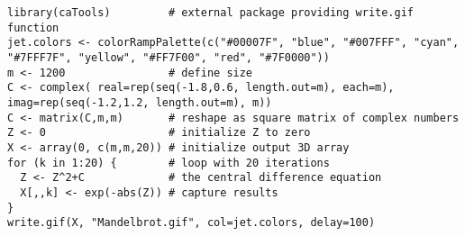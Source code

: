 \documentclass[a4paper,12pt]{article}
\begin{document}
\begin{lstlisting}[label=mandelbrot-code,caption=Рисуем фрактал Мандельброта на R]
library(caTools)         # external package providing write.gif function
jet.colors <- colorRampPalette(c("#00007F", "blue", "#007FFF", "cyan", "#7FFF7F", "yellow", "#FF7F00", "red", "#7F0000")) 
m <- 1200                # define size
C <- complex( real=rep(seq(-1.8,0.6, length.out=m), each=m), imag=rep(seq(-1.2,1.2, length.out=m), m)) 
C <- matrix(C,m,m)       # reshape as square matrix of complex numbers
Z <- 0                   # initialize Z to zero
X <- array(0, c(m,m,20)) # initialize output 3D array
for (k in 1:20) {        # loop with 20 iterations
  Z <- Z^2+C             # the central difference equation  
  X[,,k] <- exp(-abs(Z)) # capture results
} 
write.gif(X, "Mandelbrot.gif", col=jet.colors, delay=100)
\end{lstlisting}
\end{document}
